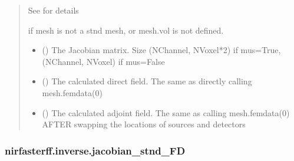 \documentclass[letterpaper,10pt,english]{sphinxmanual}
\begin{document}
\begin{fulllineitems}
\begin{quote}
\begin{description}
\begin{itemize}
\sphinxAtStartPar
See {\hyperref[\detokenize{_autosummary/nirfasterff.utils.SolverOptions:nirfasterff.utils.SolverOptions}]{}} for details


\end{itemize}

\sphinxAtStartPar
{} \textendash{} if mesh is not a stnd mesh, or mesh.vol is not defined.

\sphinxAtStartPar
\begin{itemize}
\item {} 
\sphinxAtStartPar
{} () \textendash{} The Jacobian matrix. Size (NChannel, NVoxel*2) if mus=True, (NChannel, NVoxel) if mus=False

\item {} 
\sphinxAtStartPar
{} () \textendash{} The calculated direct field. The same as directly calling mesh.femdata(0)

\item {} 
\sphinxAtStartPar
{} () \textendash{} The calculated adjoint field. The same as calling mesh.femdata(0) AFTER swapping the locations of sources and detectors

\end{itemize}


\end{description}\end{quote}

\end{fulllineitems}


\sphinxstepscope


\subsubsection{nirfasterff.inverse.jacobian\_stnd\_FD}
\label{\detokenize{_autosummary/nirfasterff.inverse.jacobian_stnd_FD:nirfasterff-inverse-jacobian-stnd-fd}}\label{\detokenize{_autosummary/nirfasterff.inverse.jacobian_stnd_FD::doc}}
\end{document}

